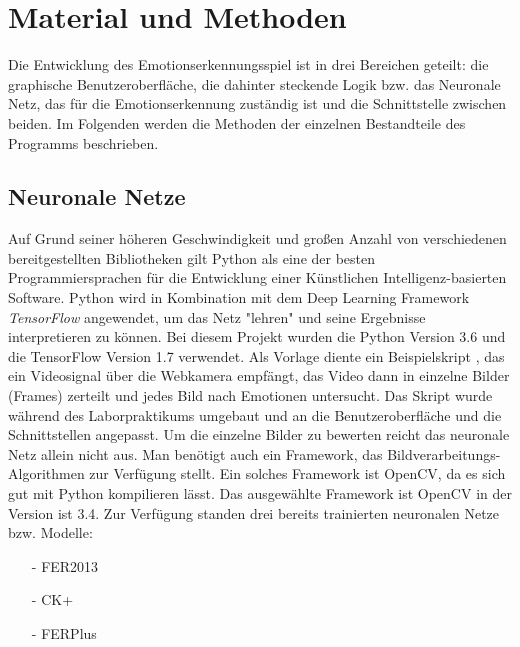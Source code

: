 \documentclass[10pt,a4paper]{report}
\begin{document}
\section{Material und Methoden}
Die Entwicklung des Emotionserkennungsspiel ist in drei Bereichen geteilt:
die graphische Benutzeroberfläche, die dahinter steckende Logik bzw. das
Neuronale Netz, das für die Emotionserkennung zuständig ist und die Schnittstelle
zwischen beiden. Im Folgenden werden die Methoden der einzelnen Bestandteile
des Programms beschrieben. 



\subsection{Neuronale Netze}
\label{subsec:statistical-summaries}
Auf Grund seiner höheren Geschwindigkeit und großen Anzahl von verschiedenen
bereitgestellten Bibliotheken gilt Python als eine der besten Programmiersprachen
für die Entwicklung einer Künstlichen Intelligenz-basierten Software.
\newline
Python wird in Kombination mit dem Deep Learning Framework  \textit{TensorFlow} angewendet, um das Netz "lehren" und seine Ergebnisse interpretieren zu können.
Bei diesem Projekt wurden die Python Version 3.6 und die TensorFlow Version
1.7 verwendet.
 \newline
Als Vorlage diente ein Beispielskript \cite{LeweOhlsenGit}, das ein Videosignal über die Webkamera
empfängt, das Video dann in einzelne Bilder (Frames) zerteilt und jedes Bild
nach Emotionen untersucht. Das Skript wurde während des Laborpraktikums
umgebaut und an die Benutzeroberfläche und die Schnittstellen angepasst.\newline
Um die einzelne Bilder zu bewerten reicht das neuronale Netz allein nicht aus. Man
benötigt auch ein Framework, das Bildverarbeitungs-Algorithmen zur Verfügung
stellt. Ein solches Framework ist OpenCV, da es sich gut mit Python kompilieren lässt.
Das ausgewählte Framework ist OpenCV in der Version ist 3.4.
 \newline
Zur Verfügung standen drei bereits trainierten neuronalen Netze bzw. Modelle: \newline
\begin{itemize}
\item[-]  FER2013 \cite{IasGoodefellow}
\item[-] CK+
\item[-] FERPlus \newline
\end{itemize}
 
\end{document}
